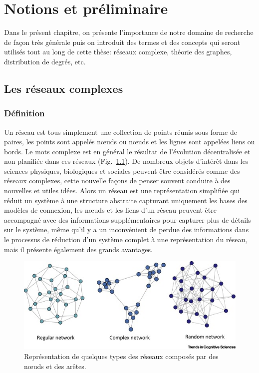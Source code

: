 %
\chapter{Notions et préliminaire}
Dans le présent chapitre, on présente l'importance de notre domaine de recherche de façon très générale puis on introduit des termes et des concepts qui seront utilisés tout au long de cette thèse: réseaux complexe, théorie des graphes, distribution de degrés, etc.
 \section{Les réseaux complexes}
  \subsection{Définition}
  Un \textsf{réseau} est tous simplement une collection de points réunis sous forme de paires, les points sont appelés nœuds ou nœuds et les lignes sont appelées liens ou bords. Le mots \textsf{complexe} est en général le résultat de  l'évolution décentralisée et non planifiée dans ces réseaux (Fig.~\ref{exemples-reseaux}). De nombreux objets d'intérêt dans les sciences physiques, biologiques et sociales peuvent être considérés comme des réseaux complexes, cette nouvelle façons de penser souvent conduire à des nouvelles et utiles idées. Alors un réseau est une représentation simplifiée qui réduit un système à une structure abstraite capturant uniquement les bases des modèles de connexion, les nœuds et les liens d'un réseau peuvent être accompagné avec des informations supplémentaires pour capturer plus de détails sur le système, même qu'il y a un inconvénient de perdue des informations dans le processus de réduction d'un système complet à une représentation du réseau, mais il présente également des grands avantages.
  
  \begin{figure}[h!]
  	\centering
  	\includegraphics[scale=0.95]{./figures/exemples-reseaux}
  	\caption{Représentation de quelques types des réseaux composés par des nœuds et des arêtes. }
  	\label{exemples-reseaux}
  \end{figure}

